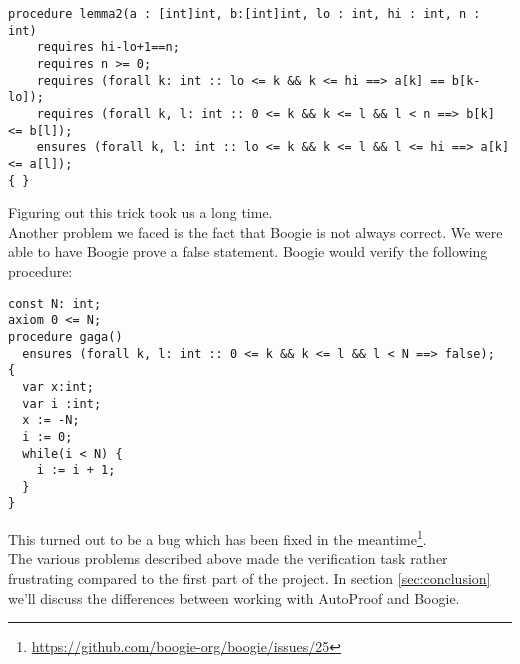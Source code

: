 \begin{verbatim}
procedure lemma2(a : [int]int, b:[int]int, lo : int, hi : int, n : int) 
    requires hi-lo+1==n;
    requires n >= 0;
    requires (forall k: int :: lo <= k && k <= hi ==> a[k] == b[k-lo]);
    requires (forall k, l: int :: 0 <= k && k <= l && l < n ==> b[k] <= b[l]);
    ensures (forall k, l: int :: lo <= k && k <= l && l <= hi ==> a[k] <= a[l]);
{ }
\end{verbatim}

Figuring out this trick took us a long time.\\

Another problem we faced is the fact that Boogie is not always correct. We were able to have Boogie prove 
a false statement. Boogie would verify the following procedure:

\begin{verbatim}
const N: int;
axiom 0 <= N;
procedure gaga()
  ensures (forall k, l: int :: 0 <= k && k <= l && l < N ==> false); 
{
  var x:int;
  var i :int;
  x := -N;
  i := 0;
  while(i < N) { 
    i := i + 1;
  }
}
\end{verbatim}

This turned out to be a bug which has been fixed in 
the meantime\footnote{\url{https://github.com/boogie-org/boogie/issues/25}}.\\

The various problems described above made the verification task rather frustrating compared to the
first part of the project. In section \ref{sec:conclusion} we'll discuss the differences between working with 
AutoProof and Boogie.


